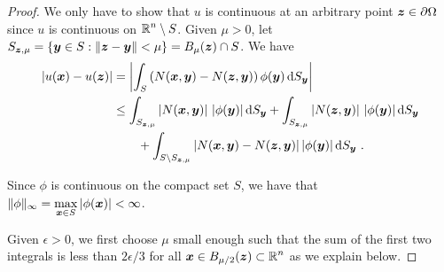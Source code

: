 \begin{proof}
We only have to show that $u$ is continuous at an arbitrary point
${\bm{z}} \in \partial \Omega$ since $u$ is continuous on
$\displaystyle \mathbb{R}^n \setminus S$.  Given $\mu >0$, let
$\displaystyle S_{{\bm{z}},\mu} = \{ {\bm{y}} \in S : \|{\bm{z}}-{\bm{y}}\|<\mu\}
= B_\mu({\bm{z}}) \cap S$.  We have
\begin{equation} \label{potSlpContEq1}
\begin{split}
|u({\bm{x}}) - u({\bm{z}})| &= \left| \int_S
\left( N({\bm{x}},{\bm{y}}) -  N({\bm{z}},{\bm{y}}) \right)
\phi({\bm{y}}) \,\mathrm{d}{S}_{{\bm{y}}} \right| \\
&\leq \int_{S_{{\bm{z}},\mu}} \left| N({\bm{x}},{\bm{y}}) \right|\,
|\phi({\bm{y}})| \,\mathrm{d}{S}_{{\bm{y}}}
+ \int_{S_{{\bm{z}},\mu}}\left| N({\bm{z}},{\bm{y}}) \right|\,
|\phi({\bm{y}})| \,\mathrm{d}{S}_{{\bm{y}}} \\
&\qquad + \int_{S \setminus S_{{\bm{z}},\mu}}
\left| N({\bm{x}},{\bm{y}}) - N({\bm{z}},{\bm{y}}) \right|
|\phi({\bm{y}}) |\,\mathrm{d}{S}_{{\bm{y}}} \ .
\end{split}
\end{equation}

Since $\phi$ is continuous on the compact set
$S$, we have that $\displaystyle \|\phi\|_\infty =
\max_{{\bm{x}}\in S} |\phi({\bm{x}})| < \infty$.

Given $\epsilon>0$, we first choose $\mu$ small enough such that
the sum of the first two integrals is less than $2\epsilon/3$ for all
$\displaystyle {\bm{x}} \in B_{\mu/2}({\bm{z}}) \subset \mathbb{R}^n$ as we
explain below.


\end{proof}
